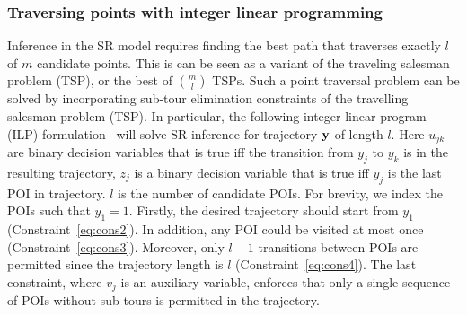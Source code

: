 \subsubsection{Traversing points with integer linear programming}
Inference in the SR model requires finding the best path that traverses exactly $l$ of $m$ candidate points. 
This is can be seen as a variant of the traveling salesman problem (TSP), or the best of ${m \choose l}$ TSPs.
Such a point traversal problem can be solved by incorporating 
sub-tour elimination constraints of the travelling salesman problem (TSP).
In particular, the following integer linear program (ILP) formulation~\cite{ijcai15,cikm16paper} 
will solve SR inference for trajectory $\mathbf{y}$ of length $l$. 
Here $u_{jk}$ are binary decision variables that is true iff the transition from $y_j$ to $y_k$ is in the resulting trajectory,
$z_j$ is a binary decision variable that is true iff $y_j$ is the last POI in trajectory.
$l$ is the number of candidate POIs.
For brevity, we index the POIs such that $y_1 = 1$.
Firstly, the desired trajectory should start from $y_1$ (Constraint~\ref{eq:cons2}).
In addition, any POI could be visited at most once (Constraint~\ref{eq:cons3}).
Moreover, only $l-1$ transitions between POIs are permitted 
since the trajectory length is $l$ (Constraint~\ref{eq:cons4}).
The last constraint, where $v_j$ is an auxiliary variable,
enforces that only a single sequence of POIs without sub-tours is permitted in the trajectory.

